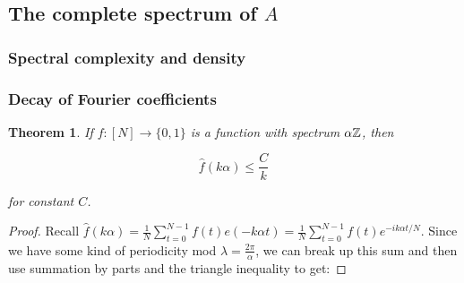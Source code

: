 \documentclass{article}
\newtheorem{theorem}{Theorem}[section]
\theoremstyle{definition}
\theoremstyle{remark}
\numberwithin{equation}{section}
\begin{document}
{\color{red}

\subsection{The complete spectrum of $A$}

\subsubsection{Spectral complexity and density}


\subsubsection{Decay of Fourier coefficients}

\begin{theorem}\label{thm:decay}
  If $f : [N] \to \{0,1\}$ is a function with spectrum $\alpha\mathbb{Z}$, then

  \[\widehat{f}(k\alpha) \leq \frac{C}{k}\]

  for constant $C$.  
\end{theorem}

\begin{proof}


Recall $\widehat{f}(k\alpha) =
\frac{1}{N}\displaystyle\sum_{t=0}^{N-1}f(t)e(-k\alpha t) =
\frac{1}{N}\displaystyle\sum_{t=0}^{N-1}f(t)e^{-i k\alpha t/N}$.
Since we have some kind of periodicity mod $\lambda = \frac{2\pi}{\alpha}$,
we can break up this sum and then use summation by parts and the
triangle inequality to get:


\end{proof}}
\end{document}
